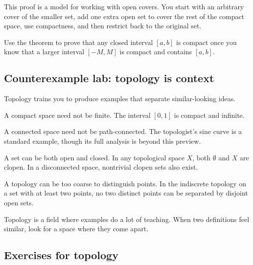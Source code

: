 This proof is a model for working with open covers. You start with an arbitrary
cover of the smaller set, add one extra open set to cover the rest of the compact
space, use compactness, and then restrict back to the original set.

\begin{labbox}
Use the theorem to prove that any closed interval $[a,b]$ is compact once you
know that a larger interval $[-M,M]$ is compact and contains $[a,b]$.
\end{labbox}

\subsection{Counterexample lab: topology is context}

Topology trains you to produce examples that separate similar-looking ideas.

\begin{example}
A compact space need not be finite. The interval $[0,1]$ is compact and
infinite.
\end{example}

\begin{example}
A connected space need not be path-connected. The topologist's sine curve is a
standard example, though its full analysis is beyond this preview.
\end{example}

\begin{example}
A set can be both open and closed. In any topological space $X$, both
$\emptyset$ and $X$ are clopen. In a disconnected space, nontrivial clopen sets
also exist.
\end{example}

\begin{example}
A topology can be too coarse to distinguish points. In the indiscrete topology
on a set with at least two points, no two distinct points can be separated by
disjoint open sets.
\end{example}

\begin{focusbox}
Topology is a field where examples do a lot of teaching. When two definitions
feel similar, look for a space where they come apart.
\end{focusbox}

\subsection{Exercises for topology}

